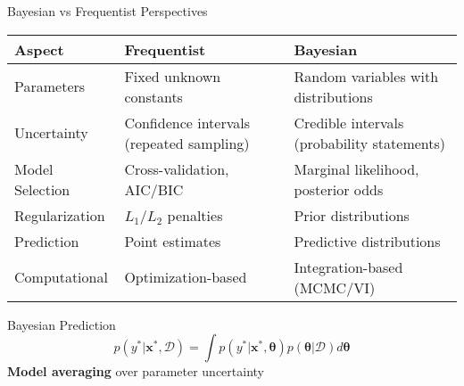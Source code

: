 \documentclass[aspectratio=169,11pt]{beamer}
\newcommand{\btheta}{\boldsymbol{\theta}}
\newcommand{\bx}{\mathbf{x}}
\begin{document}
\begin{frame}{Bayesian vs Frequentist Perspectives}
\begin{table}
\centering
\begin{tabular}{p{3cm}p{4cm}p{4cm}}
\toprule
\textbf{Aspect} & \textbf{Frequentist} & \textbf{Bayesian} \\
\midrule
Parameters & Fixed unknown constants & Random variables with distributions \\
\midrule
Uncertainty & Confidence intervals (repeated sampling) & Credible intervals (probability statements) \\
\midrule
Model Selection & Cross-validation, AIC/BIC & Marginal likelihood, posterior odds \\
\midrule
Regularization & $L_1$/$L_2$ penalties & Prior distributions \\
\midrule
Prediction & Point estimates & Predictive distributions \\
\midrule
Computational & Optimization-based & Integration-based (MCMC/VI) \\
\bottomrule
\end{tabular}
\end{table}

\begin{block}{Bayesian Prediction}
\[p(y^*|\bx^*, \mathcal{D}) = \int p(y^*|\bx^*, \btheta) p(\btheta|\mathcal{D}) d\btheta\]
\textbf{Model averaging} over parameter uncertainty
\end{block}
\end{frame}
\end{document}
